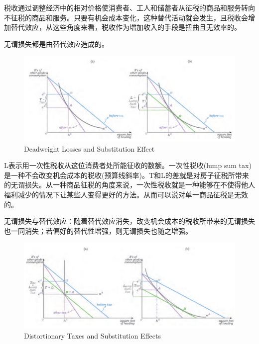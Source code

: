 \documentclass{article}
\begin{document}
税收通过调整经济中的相对价格使消费者、工人和储蓄者从征税的商品和服务转向不征税的商品和服务。只要有机会成本变化，这种替代活动就会发生，且税收会增加替代效应，从这些角度来看，税收作为增加收入的手段是扭曲且无效率的。

无谓损失都是由替代效应造成的。
\begin{figure}[H] %
	\centering %
	\includegraphics[width=1\textwidth]{DWL} %
	\caption{Deadweight Losses and Substitution Effect} %
	\label{Fig.main2} %
\end{figure}

L表示用一次性税收从这位消费者处所能征收的数额。一次性税收(lump sum tax)是一种不会改变机会成本的税收(预算线斜率)。T和L的差就是对房子征税所带来的无谓损失。从一种商品征税的角度来说，一次性税收就是一种能够在不使得他人福利减少的情况下让某些人变得更好的方法。从而可以说对单一商品征税是无效的。

\hspace*{\fill}

无谓损失与替代效应：随着替代效应消失，改变机会成本的税收所带来的无谓损失也一同消失；若偏好的替代性增强，则无谓损失也随之增强。

\begin{figure}[H] %
	\centering %
	\includegraphics[width=1\textwidth]{DWL_1} %
	\caption{Distortionary Taxes and Substitution Effects} %
	\label{Fig.main3} %
\end{figure}
\end{document}
